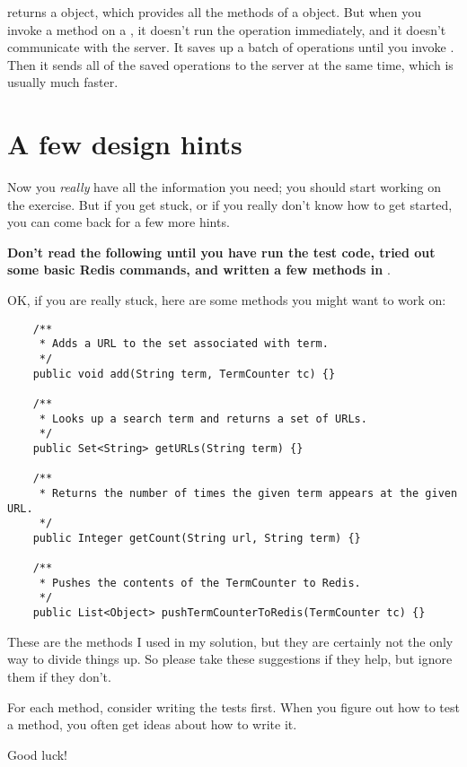 \documentclass[12pt]{book}
\theoremstyle{exercise}
\begin{document}
 returns a  object, which
provides all the methods of a  object. But when you invoke
a method on a , it doesn't run the operation
immediately, and it doesn't communicate with the server. It saves up a
batch of operations until you invoke . Then it sends all of
the saved operations to the server at the same time, which is usually
much faster.




\section{A few design hints}
\label{a-few-design-hints}

Now you \emph{really} have all the information you need; you should
start working on the exercise. But if you get stuck, or if you really don't
know how to get started, you can come back for a few more hints.

\textbf{Don't read the following until you have run the test code, tried
out some basic Redis commands, and written a few methods in
}.

OK, if you are really stuck, here are some methods you might want to
work on:

\begin{verbatim}
    /**
     * Adds a URL to the set associated with term.
     */
    public void add(String term, TermCounter tc) {}

    /**
     * Looks up a search term and returns a set of URLs.
     */
    public Set<String> getURLs(String term) {}

    /**
     * Returns the number of times the given term appears at the given URL.
     */
    public Integer getCount(String url, String term) {}

    /**
     * Pushes the contents of the TermCounter to Redis.
     */
    public List<Object> pushTermCounterToRedis(TermCounter tc) {}
\end{verbatim}

These are the methods I used in my solution, but they are certainly
not the only way to divide things up. So please take these suggestions
if they help, but ignore them if they don't.

For each method, consider writing the tests first. When you figure out
how to test a method, you often get ideas about how to write it.

Good luck!
\end{document}
